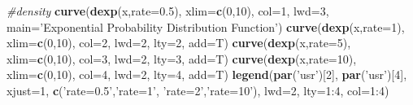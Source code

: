 \documentclass[]{article}
\newenvironment{Shaded}{\begin{snugshade}}{\end{snugshade}}
\newcommand{\KeywordTok}[1]{\textcolor[rgb]{0.13,0.29,0.53}{\textbf{{#1}}}}
\newcommand{\DataTypeTok}[1]{\textcolor[rgb]{0.13,0.29,0.53}{{#1}}}
\newcommand{\DecValTok}[1]{\textcolor[rgb]{0.00,0.00,0.81}{{#1}}}
\newcommand{\FloatTok}[1]{\textcolor[rgb]{0.00,0.00,0.81}{{#1}}}
\newcommand{\StringTok}[1]{\textcolor[rgb]{0.31,0.60,0.02}{{#1}}}
\newcommand{\CommentTok}[1]{\textcolor[rgb]{0.56,0.35,0.01}{\textit{{#1}}}}
\newcommand{\NormalTok}[1]{{#1}}
\begin{document}
\begin{Shaded}
\begin{Highlighting}[]
\CommentTok{#density}
\KeywordTok{curve}\NormalTok{(}\KeywordTok{dexp}\NormalTok{(x,}\DataTypeTok{rate=}\FloatTok{0.5}\NormalTok{), }\DataTypeTok{xlim=}\KeywordTok{c}\NormalTok{(}\DecValTok{0}\NormalTok{,}\DecValTok{10}\NormalTok{), }\DataTypeTok{col=}\DecValTok{1}\NormalTok{, }\DataTypeTok{lwd=}\DecValTok{3}\NormalTok{,}
      \DataTypeTok{main=}\StringTok{'Exponential Probability Distribution Function'}\NormalTok{)}
\KeywordTok{curve}\NormalTok{(}\KeywordTok{dexp}\NormalTok{(x,}\DataTypeTok{rate=}\DecValTok{1}\NormalTok{), }\DataTypeTok{xlim=}\KeywordTok{c}\NormalTok{(}\DecValTok{0}\NormalTok{,}\DecValTok{10}\NormalTok{), }\DataTypeTok{col=}\DecValTok{2}\NormalTok{, }\DataTypeTok{lwd=}\DecValTok{2}\NormalTok{, }\DataTypeTok{lty=}\DecValTok{2}\NormalTok{,}
      \DataTypeTok{add=}\NormalTok{T)}
\KeywordTok{curve}\NormalTok{(}\KeywordTok{dexp}\NormalTok{(x,}\DataTypeTok{rate=}\DecValTok{5}\NormalTok{), }\DataTypeTok{xlim=}\KeywordTok{c}\NormalTok{(}\DecValTok{0}\NormalTok{,}\DecValTok{10}\NormalTok{), }\DataTypeTok{col=}\DecValTok{3}\NormalTok{, }\DataTypeTok{lwd=}\DecValTok{2}\NormalTok{, }\DataTypeTok{lty=}\DecValTok{3}\NormalTok{,}
      \DataTypeTok{add=}\NormalTok{T)}
\KeywordTok{curve}\NormalTok{(}\KeywordTok{dexp}\NormalTok{(x,}\DataTypeTok{rate=}\DecValTok{10}\NormalTok{), }\DataTypeTok{xlim=}\KeywordTok{c}\NormalTok{(}\DecValTok{0}\NormalTok{,}\DecValTok{10}\NormalTok{), }\DataTypeTok{col=}\DecValTok{4}\NormalTok{, }\DataTypeTok{lwd=}\DecValTok{2}\NormalTok{, }\DataTypeTok{lty=}\DecValTok{4}\NormalTok{,}
      \DataTypeTok{add=}\NormalTok{T)}
\KeywordTok{legend}\NormalTok{(}\KeywordTok{par}\NormalTok{(}\StringTok{'usr'}\NormalTok{)[}\DecValTok{2}\NormalTok{], }\KeywordTok{par}\NormalTok{(}\StringTok{'usr'}\NormalTok{)[}\DecValTok{4}\NormalTok{], }\DataTypeTok{xjust=}\DecValTok{1}\NormalTok{,}
       \KeywordTok{c}\NormalTok{(}\StringTok{'rate=0.5'}\NormalTok{,}\StringTok{'rate=1'}\NormalTok{, }\StringTok{'rate=2'}\NormalTok{,}\StringTok{'rate=10'}\NormalTok{),}
       \DataTypeTok{lwd=}\DecValTok{2}\NormalTok{, }\DataTypeTok{lty=}\DecValTok{1}\NormalTok{:}\DecValTok{4}\NormalTok{,}
       \DataTypeTok{col=}\DecValTok{1}\NormalTok{:}\DecValTok{4}\NormalTok{)}
\end{Highlighting}
\end{Shaded}
\end{document}
